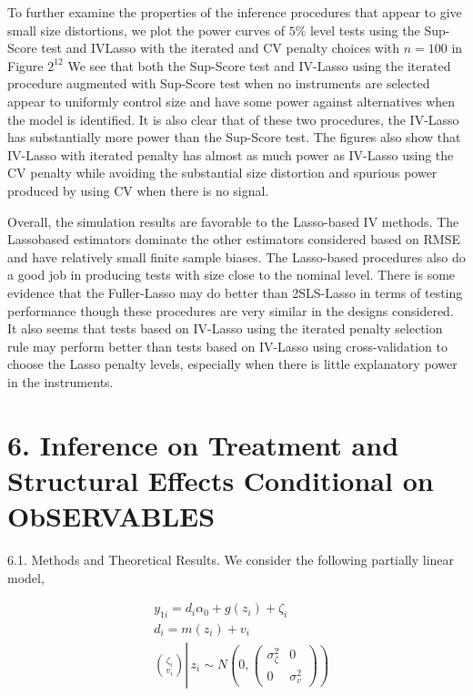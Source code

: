 \documentclass[10pt]{article}
\begin{document}
To further examine the properties of the inference procedures that appear to give small size distortions, we plot the power curves of \(5 \%\) level tests using the Sup-Score test and IVLasso with the iterated and CV penalty choices with \(n=100\) in Figure \(2^{12}\) We see that both the Sup-Score test and IV-Lasso using the iterated procedure augmented with Sup-Score test when no instruments are selected appear to uniformly control size and have some power against alternatives when the model is identified. It is also clear that of these two procedures, the IV-Lasso has substantially more power than the Sup-Score test. The figures also show that IV-Lasso with iterated penalty has almost as much power as IV-Lasso using the CV penalty while avoiding the substantial size distortion and spurious power produced by using CV when there is no signal.

Overall, the simulation results are favorable to the Lasso-based IV methods. The Lassobased estimators dominate the other estimators considered based on RMSE and have relatively small finite sample biases. The Lasso-based procedures also do a good job in producing tests with size close to the nominal level. There is some evidence that the Fuller-Lasso may do better than 2SLS-Lasso in terms of testing performance though these procedures are very similar in the designs considered. It also seems that tests based on IV-Lasso using the iterated penalty selection rule may perform better than tests based on IV-Lasso using cross-validation to choose the Lasso penalty levels, especially when there is little explanatory power in the instruments.

\section*{6. Inference on Treatment and Structural Effects Conditional on ObSERVABLES}
6.1. Methods and Theoretical Results. We consider the following partially linear model,

\[
\begin{aligned}
& y_{1 i}=d_{i} \alpha_{0}+g\left(z_{i}\right)+\zeta_{i} \\
& d_{i}=m\left(z_{i}\right)+v_{i} \\
& \binom{\zeta_{i}}{v_{i}} \left\lvert\, z_{i} \sim N\left(0,\left(\begin{array}{cc}
\sigma_{\zeta}^{2} & 0 \\
0 & \sigma_{v}^{2}
\end{array}\right)\right)\right.
\end{aligned}
\]
\end{document}
